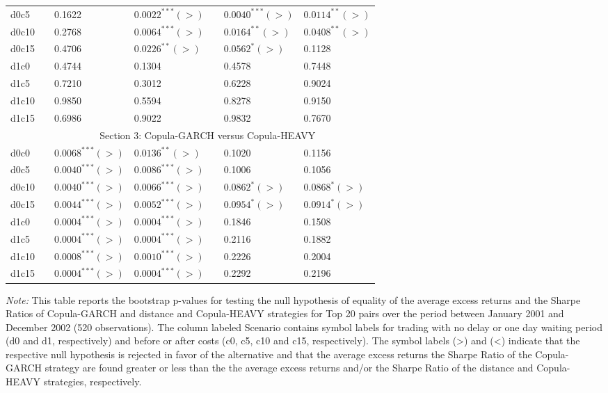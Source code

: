 \documentclass[a4paper,12pt]{report}
\begin{document}
\begin{threeparttable}[H]
\begin{tabularx}{\textwidth}{@{\extracolsep{\fill}}lllllll@{}}
		d0c5 & & 0.1622 & $0.0022^{***}(>)$ &       & $0.0040^{***}(>)$ & $0.0114^{**}(>)$   \\
		d0c10 & & 0.2768 & $0.0064^{***}(>)$ &       & $0.0164^{**}(>)$ & $0.0408^{**}(>)$ \\
		d0c15 & & 0.4706 & $0.0226^{**}(>)$ &       & $0.0562^{*}(>)$ & 0.1128 \\
		d1c0 & & 0.4744 & 0.1304  &       & 0.4578 & 0.7448 \\
		d1c5 & & 0.7210 & 0.3012 &       & 0.6228 & 0.9024 \\
		d1c10 & & 0.9850 & 0.5594  &       & 0.8278 & 0.9150 \\
		d1c15 & & 0.6986 & 0.9022 &       & 0.9832 & 0.7670 \\
		\midrule
		& \multicolumn{6}{c}{Section 3: Copula-GARCH versus Copula-HEAVY} \\
		\midrule
		d0c0 & & $0.0068^{***}(>)$ & $0.0136^{**}(>)$ &       & 0.1020 & 0.1156 \\
		d0c5 & & $0.0040^{***}(>)$ & $0.0086^{***}(>)$ &       & 0.1006 & 0.1056   \\
		d0c10 & & $0.0040^{***}(>)$ & $0.0066^{***}(>)$ &       & $0.0862^{*}(>)$ & $0.0868^{*}(>)$ \\
		d0c15 & & $0.0044^{***}(>)$ & $0.0052^{***}(>)$ &       & $0.0954^{*}(>)$ & $0.0914^{*}(>)$ \\
		d1c0 & & $0.0004^{***}(>)$  & $0.0004^{***}(>)$  &       & 0.1846  & 0.1508 \\
		d1c5 & & $0.0004^{***}(>)$ & $0.0004^{***}(>)$ &       & 0.2116 & 0.1882 \\
		d1c10 & & $0.0008^{***}(>)$ & $0.0010^{***}(>)$ &       & 0.2226 & 0.2004 \\
		d1c15 & & $0.0004^{***}(>)$ & $0.0004^{***}(>)$ &       & 0.2292 & 0.2196 \\
		\bottomrule
	\end{tabularx}%
	\begin{tablenotes}
		\item \textit{Note:} \scriptsize This table reports the bootstrap p-values for testing the null hypothesis of equality of the average excess returns and the Sharpe Ratios of Copula-GARCH and distance and Copula-HEAVY strategies for Top 20 pairs over the period between January 2001 and December 2002 (520 observations). The column labeled Scenario contains symbol labels for trading with no delay or one day waiting period (d0 and d1, respectively) and before or after costs (c0, c5, c10 and c15, respectively). The symbol labels (>) and (<) indicate that the respective null hypothesis is rejected in favor of the alternative and that the average excess returns the Sharpe Ratio of the Copula-GARCH strategy are found greater or less than the the average excess returns and/or the Sharpe Ratio of the distance and Copula-HEAVY strategies, respectively.

\end{tablenotes}
\end{threeparttable}
\end{document}
